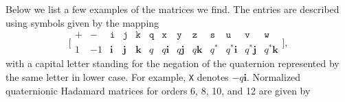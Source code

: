 \documentclass[12pt]{article}
\numberwithin{equation}{section}
\newcommand{\qi}{\mathbf{i}}
\newcommand{\qj}{\mathbf{j}}
\newcommand{\qk}{\mathbf{k}}
\begin{document}
Below we list a few examples of the matrices we find.
The entries are described using symbols given by the mapping
\begin{equation}
\label{eq-qt-pqs-mapping}
\Big[\begin{array}{ccccccccccccc}
\texttt + & \texttt - & \texttt i & \texttt j & \texttt k & \texttt q & \texttt x & \texttt y & \texttt z & \texttt s & \texttt u & \texttt v & \texttt w \\
1 & -1 & \qi & \qj & \qk & q & q\qi & q\qj & q\qk & q^* & q^*\qi & q^*\qj & q^*\qk
\end{array}\Big] , 
\end{equation}
with a capital letter standing for the negation of the quaternion
represented by the same letter in lower case.
For example, \texttt{X} denotes $-q\qi$.
Normalized quaternionic Hadamard matrices for
orders 6, 8, 10, and 12 are given by
\setcounter{MaxMatrixCols}{20}
\end{document}
